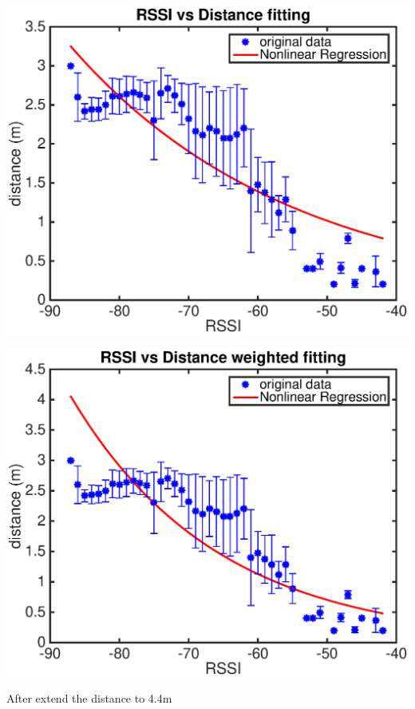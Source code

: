 \documentclass[11pt]{beamer}
\author{Hong Xiong}
\begin{document}

\begin{frame}
\includegraphics[width=\textwidth]{rssi_dis_fit.eps} 
\end{frame}

\begin{frame}
\includegraphics[width=\textwidth]{rssi_dis_fit_weighted.eps} 
\end{frame}

\begin{frame}
\centering
{\LARGE After extend the distance to 4.4m}
\end{frame}
\end{document}
